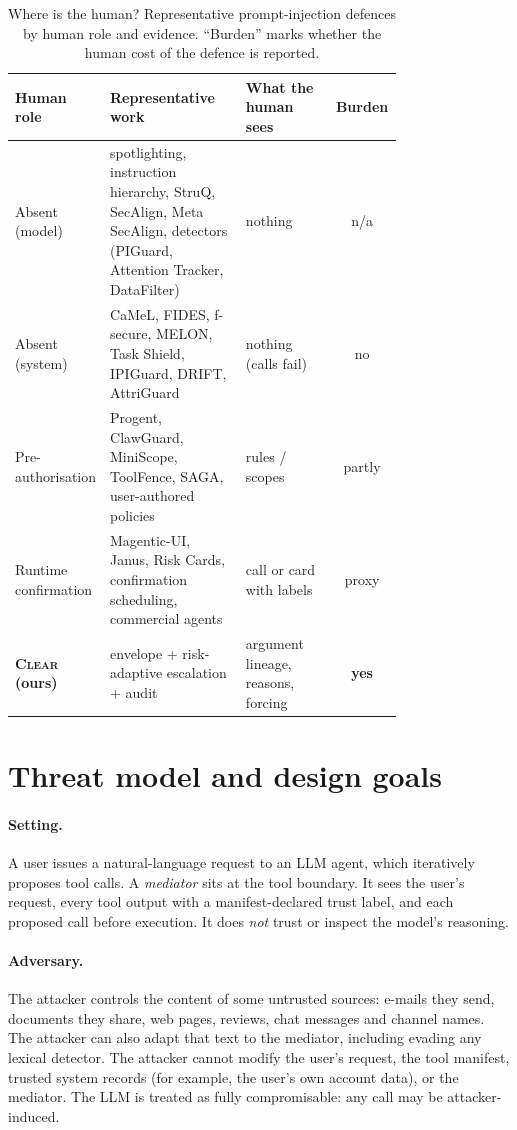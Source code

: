 \documentclass[preprint,12pt,nonatbib]{elsarticle}
\theoremstyle{remark}
\newcommand{\clear}{\textsc{Clear}}
\begin{document}
\begin{table}[t]
\centering\small
\caption{Where is the human? Representative prompt-injection defences by human role and evidence. ``Burden'' marks whether the human cost of the defence is reported.}
\label{tab:taxonomy}
\begin{tabular}{p{0.19\linewidth}p{0.35\linewidth}p{0.23\linewidth}c}
\toprule
Human role & Representative work & What the human sees & Burden \\
\midrule
Absent (model) & spotlighting, instruction hierarchy, StruQ, SecAlign, Meta SecAlign, detectors (PIGuard, Attention Tracker, DataFilter) & nothing & n/a \\
Absent (system) & CaMeL, FIDES, f-secure, MELON, Task Shield, IPIGuard, DRIFT, AttriGuard & nothing (calls fail) & no \\
Pre-authorisation & Progent, ClawGuard, MiniScope, ToolFence, SAGA, user-authored policies & rules / scopes & partly \\
Runtime confirmation & Magentic-UI, Janus, Risk Cards, confirmation scheduling, commercial agents & call or card with labels & proxy \\
\textbf{\clear{} (ours)} & envelope + risk-adaptive escalation + audit & argument lineage, reasons, forcing & \textbf{yes} \\
\bottomrule
\end{tabular}
\end{table}

\section{Threat model and design goals}
\label{sec:threat}

\paragraph{Setting.} A user issues a natural-language request to an LLM agent,
which iteratively proposes tool calls. A \emph{mediator} sits at the tool
boundary. It sees the user's request, every tool output with a manifest-declared
trust label, and each proposed call before execution. It does \emph{not} trust
or inspect the model's reasoning.

\paragraph{Adversary.} The attacker controls the content of some untrusted
sources: e-mails they send, documents they share, web pages, reviews, chat
messages and channel names. The attacker can also adapt that text to the
mediator, including evading any lexical detector. The attacker cannot modify
the user's request, the tool manifest, trusted system records (for example, the
user's own account data), or the mediator. The LLM is treated as fully
compromisable: any call may be attacker-induced.
\end{document}
